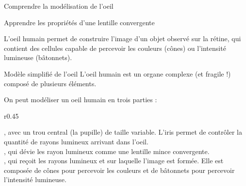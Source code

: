 \teteSndLumi
\vspace*{-32pt}



\vspace*{-12pt}
\begin{objectifs}
  \item Comprendre la modélisation de l'oeil
  \item Apprendre les propriétés d'une lentille convergente
\end{objectifs}

\begin{contexte}
  L'oeil humain permet de construire l'image d'un objet observé sur la rétine, qui contient des cellules capable de percevoir les couleurs (cônes) ou l'intensité lumineuse (bâtonnets).
  
\end{contexte}


\begin{doc}{Modèle simplifié de l'oeil}
  \label{doc:modele_oeil}
  L'oeil humain est un organe complexe (et fragile !) composé de plusieurs éléments.
 
  On peut modéliser un oeil humain en trois parties :
  
  \begin{wrapfigure}[8]{r}{0.45\linewidth}
    \centering
    \vspace*{-12pt}
  \end{wrapfigure}
  \pointCyan {}, avec un trou central (la pupille) de taille variable. L'iris permet de contrôler la quantité de rayons lumineux arrivant dans l'oeil. \\
  \pointCyan {}, qui dévie les rayon lumineux comme une lentille mince convergente. \\
  \pointCyan {}, qui reçoit les rayons lumineux et sur laquelle l'image est formée.
  Elle est composée de cônes pour percevoir les couleurs et de bâtonnets pour percevoir l'intensité lumineuse.
\end{doc}

